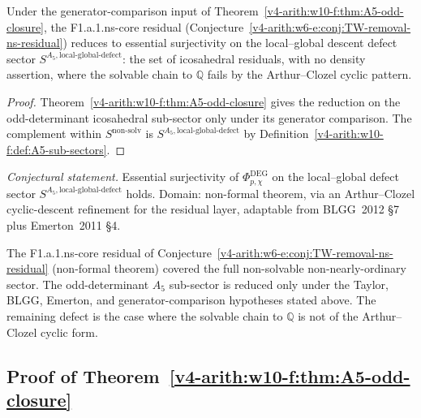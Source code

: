 \begin{corollary}
\label{v4-arith:w10-f:cor:ns-core-reduction}
Under the generator-comparison input of
Theorem~\ref{v4-arith:w10-f:thm:A5-odd-closure}, the F1.a.1.ns-core residual
(Conjecture~\ref{v4-arith:w6-e:conj:TW-removal-ns-residual}) reduces to
essential surjectivity on the local--global descent defect sector
\(S^{A_{5},\mathrm{local\text{-}global\text{-}defect}}\): the set
of icosahedral residuals, with no density assertion, where the solvable chain to \(\mathbb{Q}\)
fails by the Arthur--Clozel cyclic pattern.
\end{corollary}

\begin{proof}
Theorem~\ref{v4-arith:w10-f:thm:A5-odd-closure} gives the reduction on the
odd-determinant icosahedral sub-sector only under its generator
comparison. The complement within
\(S^{\mathrm{non\text{-}solv}}\) is
\(S^{A_{5},\mathrm{local\text{-}global\text{-}defect}}\) by
Definition~\ref{v4-arith:w10-f:def:A5-sub-sectors}.
\end{proof}

\begin{conjecture}
\label{v4-arith:w10-f:conj:ns-defect}
\emph{Conjectural statement.} Essential surjectivity of
\(\Phi^{\mathrm{DEG}}_{p,\chi}\) on the local--global defect sector
\(S^{A_{5},\mathrm{local\text{-}global\text{-}defect}}\) holds. Domain:
non-formal theorem, via an Arthur--Clozel cyclic-descent refinement for the
residual layer, adaptable from BLGG~2012 \S 7 plus Emerton~2011 \S 4.
\end{conjecture}

\begin{remark}
\label{v4-arith:w10-f:rem:ns-defect-narrow}
The F1.a.1.ns-core residual of
Conjecture~\ref{v4-arith:w6-e:conj:TW-removal-ns-residual} (non-formal theorem)
covered the full non-solvable non-nearly-ordinary sector. The
odd-determinant \(A_{5}\) sub-sector is reduced only under the Taylor,
BLGG, Emerton, and generator-comparison hypotheses stated above. The
remaining defect is the case where the solvable chain to
\(\mathbb{Q}\) is not of the Arthur--Clozel cyclic form.
\end{remark}

\subsection{Proof of Theorem~\ref{v4-arith:w10-f:thm:A5-odd-closure}}
\label{v4-arith:w10-f:obstruction-analysis-ns}

